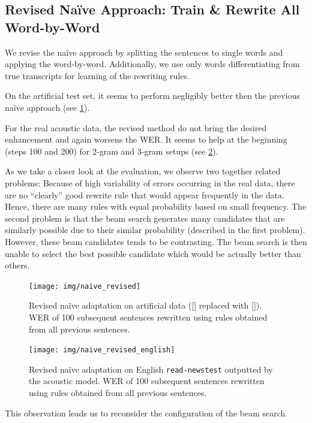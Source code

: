 \subsection[Revised Na\"ive Approach: Train \& Rewrite All Word-by-Word]{Revised Na\"ive Approach: Train \& Rewrite All \\Word-by-Word}
We revise the na\"ive approach by splitting the sentences to single words and applying the word-by-word. Additionally, we use only words differentiating from true transcripts for learning of the rewriting rules. 

On the artificial test set, it seems to perform negligibly better then the previous na\"ive approach (see \cref{fig:naive_revised}).

For the real acoustic data, the revised method do not bring the desired enhancement and again worsens the WER. It seems to help at the beginning (steps 100 and 200) for 2-gram and 3-gram setups (see \cref{fig:naive_revised_en}). 

As we take a closer look at the evaluation, we observe two together related problems: Because of high variability of errors occurring in the real data, there are no ``clearly'' good rewrite rule that would appear frequently in the data. Hence, there are many rules with equal probability based on small frequency. The second problem is that the beam search generates many candidates that are similarly possible due to their similar probability (described in the first problem). However, these beam candidates tends to be contrasting. The beam search is then unable to select the best possible candidate which would be actually better than others.

\begin{figure}[h]
	\texttt{[image: img/naive\_revised]}
	\caption{Revised na\"ive adaptation on artificial data ([] replaced with []). WER of 100 subsequent sentences rewritten using rules obtained from all previous sentences.}
	\label{fig:naive_revised} 
\end{figure}

\begin{figure}[h]
	\texttt{[image: img/naive\_revised\_english]}
	\caption{Revised na\"ive adaptation on English \texttt{read-newstest} outputted by the acoustic model. WER of 100 subsequent sentences rewritten using rules obtained from all previous sentences.}
	\label{fig:naive_revised_en} 
\end{figure}

This observation leads us to reconsider the configuration of the beam search.

